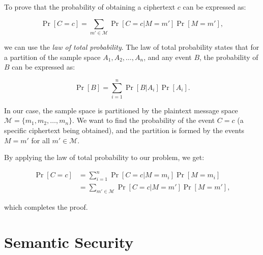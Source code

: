 \documentclass[12pt,openany]{book}
\theoremstyle{definition}
\begin{document}
	To prove that the probability of obtaining a ciphertext $c$ can be expressed as:
	
	\begin{equation}
	\Pr[C = c] = \sum_{m' \in \mathcal{M}} \Pr[C = c | M = m']\Pr[M = m'],
	\end{equation}
	
	\noindent we can use the \textit{law of total probability}. The law of total probability states that for a partition of the sample space $A_1, A_2, \dots, A_n$, and any event $B$, the probability of $B$ can be expressed as:
	
	\begin{equation}
	\Pr[B] = \sum_{i=1}^{n} \Pr[B | A_i] \Pr[A_i].
	\end{equation}
	
	In our case, the sample space is partitioned by the plaintext message space $\mathcal{M} = \{m_1, m_2, \dots, m_n\}$. We want to find the probability of the event $C = c$ (a specific ciphertext being obtained), and the partition is formed by the events $M = m'$ for all $m' \in \mathcal{M}$.
	
	By applying the law of total probability to our problem, we get:
	
	\begin{align*}
	\Pr[C = c] &= \sum_{i=1}^{n} \Pr[C = c | M = m_i] \Pr[M = m_i] \\
	&= \sum_{m' \in \mathcal{M}} \Pr[C = c | M = m'] \Pr[M = m'],
	\end{align*}
	
	which completes the proof.
	
	\newpage
	\section{Semantic Security}
	
\end{document}
